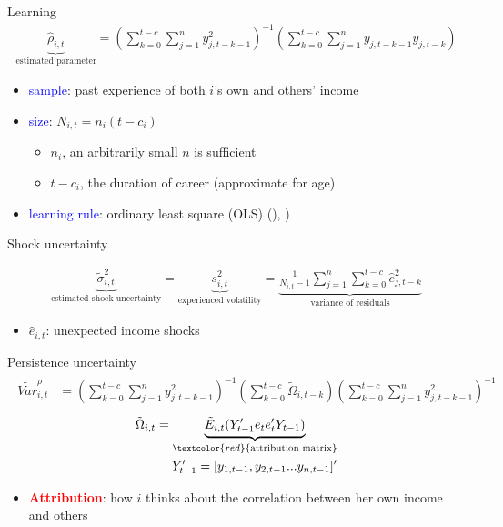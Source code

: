 \documentclass{beamer}
\begin{document}
\begin{frame}{Learning}
\begin{eqnarray}
\underbrace{\hat \rho_{i,t}}_{\text{estimated parameter}}= (\sum^{t-c}_{k=0}\sum^{n}_{j=1}y^2_{j,t-k-1})^{-1}(\sum^{t-c}_{k=0}\sum^{n}_{j=1}y_{j,t-k-1}y_{j,t-k})
\end{eqnarray}

	\begin{itemize}
		\item \textcolor{blue}{sample}: past experience of both $i$'s own and others' income
		\item \textcolor{blue}{size}:   $N_{i,t} = n_i (t-c_i )$
		\begin{itemize}
		\item $n_i$, an arbitrarily small $n$ is sufficient
		 \item $t-c_i$, the duration of career (approximate for age)   
		 \end{itemize}
		\item \textcolor{blue}{learning rule}: ordinary least square (OLS) (\cite{evans2012learning}), \cite{malmendier2015learning})
	\end{itemize} 
\end{frame}

\begin{frame}{Shock uncertainty}
	
	
\begin{eqnarray}
\underbrace{\tilde{\sigma}^2_{i,t}}_{\text{estimated shock uncertainty}}=\underbrace{ s^2_{i,t}}_{\text{experienced volatility}} =\underbrace{\frac{1}{N_{i,t}-1} \sum^{n}_{j=1}\sum^{t-c}_{k=0} \hat e_{j,t-k}^2}_{\text{variance of residuals}}
\end{eqnarray}

	\begin{itemize}
	\item $\hat e_{i,t}$: unexpected income shocks 
\end{itemize} 
\end{frame}

\begin{frame}{Persistence uncertainty}
	\begin{eqnarray}
	\begin{split}
	\tilde {Var}^{\rho}_{i,t} & =   (\sum^{t-c}_{k=0}\sum^{n}_{j=1}y^2_{j,t-k-1})^{-1}(\sum^{t-c}_{k=0}\tilde \Omega_{i,t-k})(\sum^{t-c}_{k=0}\sum^{n}_{j=1}y^2_{j,t-k-1})^{-1}
	\end{split}
	\end{eqnarray}
	\begin{eqnarray}
	\begin{split}
	\tilde \Omega_{i,t} = \underbrace{\tilde E_{i,t}(Y'_{t-1}e_{t}e_{t}'Y_{t-1})}_{\textcolor{red}{\text{attribution matrix}}} \\
	Y'_{t-1} = [y_{1,t-1},y_{2,t-1}...y_{n,t-1}]'
	\end{split}
	\end{eqnarray}
	\begin{itemize}	  
		\item \textbf{\textcolor{red}{Attribution}}: how $i$ thinks about the correlation between her own income and others
	\end{itemize}
\end{frame}
\end{document}
